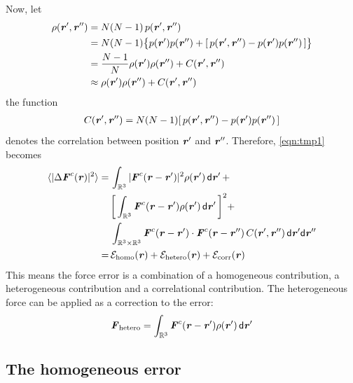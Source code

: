 \documentclass[aps,pre,preprint]{revtex4}
\renewcommand{\v}[1]{\textbf{\textit{#1}}}
\renewcommand{\d}[1]{\textsf{#1}}
\begin{document}
Now, let
\begin{align} \nonumber
  \rho(\v r', \v r'')
  & = N (N-1) \,p(\v r', \v r'') \\\nonumber
  & = N (N-1) \big\{ p(\v r')p(\v r'') + [\,p(\v r', \v r'') -  p(\v r')p(\v r'')\,]\big\} \\\nonumber
  &= \frac{N-1}N \rho(\v r')\rho(\v r'') + C (\v r', \v r'')\\ \label{eqn:tmp5}
  &\approx \rho(\v r')\rho(\v r'') + C (\v r', \v r'')
\end{align}
the function
\begin{align}
C (\v r', \v r'') = N (N-1) [\,p(\v r', \v r'') -  p(\v r')p(\v r'')\,]
\end{align}
denotes the correlation between
position $\v r'$ and $\v r''$. Therefore, \eqref{eqn:tmp1} becomes
\begin{align} \nonumber
  \langle\vert\Delta\v F^c(\v r)\vert^2\rangle
  = &\,
  \int_{\mathbb R^3}\vert\v F^c(\v r - \v r')\vert^2\rho(\v r')\,\d d\v r' \,+ \\\nonumber
  &\,
  \bigg[\int_{\mathbb R^3}\v F^c(\v r - \v r')\rho(\v r')\,\d d\v r'\,\bigg]^2 + \\\nonumber
  &\,
  \int_{\mathbb R^3\times\mathbb R^3}\v F^c(\v r - \v r')\cdot\v F^c(\v r - \v r'')\,C(\v r', \v r'')\,\d d\v r'\d d\v r'' \\\label{eqn:tmp5}
  = &\,
  \mathcal E_{\textrm{homo}}(\v r) + \mathcal E_{\textrm{hetero}}(\v r) + \mathcal E_{\textrm{corr}}(\v r)
\end{align}
This means the force error is a combination of a homogeneous
contribution, a heterogeneous contribution and a correlational
contribution. The heterogeneous force can be applied as a correction
to the error:
\begin{align}\label{eqn:tmp7}
  \v F_{\textrm{hetero}} = \int_{\mathbb R^3}\v F^c(\v r - \v r')\rho(\v r')\,\d d\v r'
\end{align}


\subsection{The homogeneous error}
\end{document}

